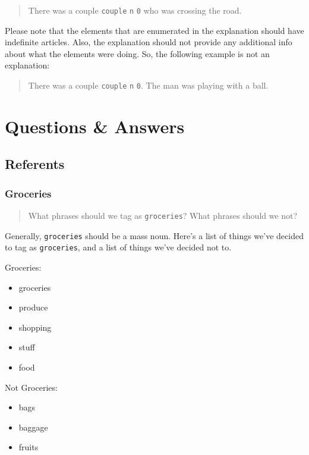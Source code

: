 \documentclass[
]{book}
\providecommand{\tightlist}{%
  \setlength{\itemsep}{0pt}\setlength{\parskip}{0pt}}
\begin{document}
\begin{quote}
There was a couple \texttt{couple} \texttt{n} \texttt{0} who was crossing the road.
\end{quote}

Please note that the elements that are enumerated in the explanation should have indefinite articles. Also, the explanation should not provide any additional info about what the elements were doing. So, the following example is not an explanation:

\begin{quote}
There was a couple \texttt{couple} \texttt{n} \texttt{0}. The man was playing with a ball.
\end{quote}

\hypertarget{questions-answers}{%
\chapter{Questions \& Answers}\label{questions-answers}}

\hypertarget{referents-1}{%
\section{Referents}\label{referents-1}}

\hypertarget{groceries}{%
\subsection{Groceries}\label{groceries}}

\begin{quote}
What phrases should we tag as \texttt{groceries}? What phrases should we not?
\end{quote}

Generally, \texttt{groceries} should be a mass noun.
Here's a list of things we've decided to tag as \texttt{groceries}, and a list of things we've decided not to.

Groceries:

\begin{itemize}
\tightlist
\item
  groceries
\item
  produce
\item
  shopping
\item
  stuff
\item
  food
\end{itemize}

Not Groceries:

\begin{itemize}
\tightlist
\item
  bags
\item
  baggage
\item
  fruits
\end{itemize}
\end{document}
